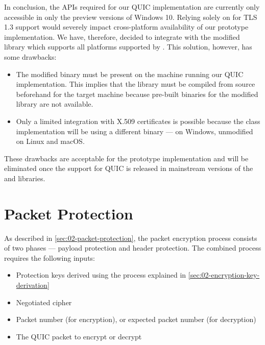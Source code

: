 In conclusion, the APIs required for our QUIC implementation are currently only accessible in only
the preview versions of Windows 10. Relying solely on \libschannel{} for TLS 1.3 support would
severely impact cross-platform availability of our prototype implementation. We have, therefore,
decided to integrate with the modified \libopenssl{} library which supports all platforms supported
by \dotnet{}. This solution, however, has some drawbacks:

\begin{itemize}

  \item The modified \libopenssl{} binary must be present on the machine running our QUIC
implementation. This implies that the library must be compiled from source beforehand for the target
machine because pre-built binaries for the modified library are not available.

  \item Only a limited integration with X.509 certificates is possible because the
 class implementation will be using a different binary --- 
on Windows, unmodified \libopenssl{} on Linux and macOS\@.

\end{itemize}

These drawbacks are acceptable for the prototype implementation and will be eliminated once the
support for QUIC is released in mainstream versions of the \libopenssl{} and \libschannel{}
libraries.

\section{Packet Protection}\label{sec:03-packet-protection}

As described in \autoref{sec:02-packet-protection}, the packet encryption process consists of two
phases --- payload protection and header protection. The combined process requires the following
inputs:

\begin{itemize}

  \item Protection keys derived using the process explained in
\autoref{sec:02-encryption-key-derivation}

  \item Negotiated cipher

  \item Packet number (for encryption), or expected packet number (for decryption)

  \item The QUIC packet to encrypt or decrypt

\end{itemize}

